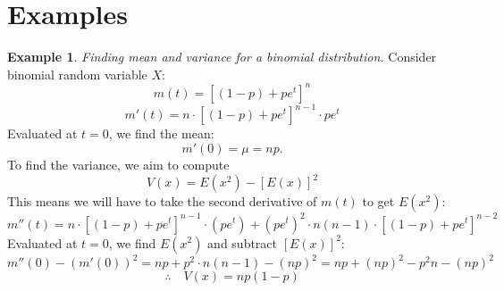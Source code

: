\documentclass[a4paper]{article}
\theoremstyle{definition}
\newtheorem{exmp}{Example}[section]
\begin{document}
\section{Examples}
\begin{exmp}
\textit{Finding mean and variance for a binomial distribution.}
\bigbreak Consider binomial random variable $X$:
$$m(t)=[(1-p)+pe^t]^n$$
$$m'(t)=n\cdot[(1-p)+pe^t]^{n-1}\cdot pe^t$$
\quad \: Evaluated at $t=0$, we find the mean:
$$m'(0)=\mu = np.$$
\quad \: To find the variance, we aim to compute
$$V(x) = E(x^2)-[E(x)]^2$$
\quad \: This means we will have to take the second derivative of $m(t)$ to get $E(x^2)$:
$$m''(t)=n\cdot[(1-p)+pe^t]^{n-1}\cdot (pe^t)+(pe^t)^2\cdot n(n-1)\cdot[(1-p)+pe^t]^{n-2}$$
\quad \: Evaluated at $t=0$, we find $E(x^2)$ and subtract $[E(x)]^2$:
$$m''(0) - (m'(0))^2 = np+p^2\cdot n(n-1)-(np)^2=np+(np)^2-p^2n-(np)^2$$
$$\therefore \quad V(x) = np(1-p)$$
\end{exmp}
\end{document}
